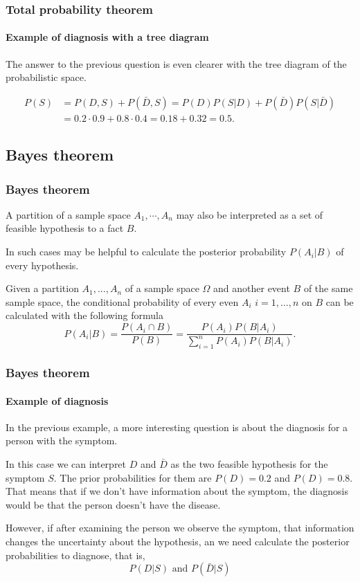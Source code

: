 \begin{frame}
\frametitle{Total probability theorem}
\framesubtitle{Example of diagnosis with a tree diagram}
The answer to the previous question is even clearer with the tree diagram of the probabilistic space.

\begin{center}
\end{center}

\begin{align*}
P(S) &= P(D,S) + P(\bar D,S) = P(D)P(S|D)+P(\bar D)P(S|\bar D)\\
& = 0.2\cdot 0.9+ 0.8\cdot 0.4 = 0.18 + 0.32 = 0.5.
\end{align*}
\end{frame}


\subsection{Bayes theorem}

\begin{frame}
\frametitle{Bayes theorem}
A partition of a sample space $A_1,\cdots,A_n$ may also be interpreted as a set of feasible hypothesis to a fact
$B$.

In such cases may be helpful to calculate the posterior probability $P(A_i|B)$ of every hypothesis.

\begin{theorem}[Bayes]
Given a partition $A_1,\ldots,A_n$ of a sample space $\Omega$ and another event $B$ of the same sample space, the
conditional probability of every even $A_i$ $i=1,\ldots,n$ on $B$ can be calculated with the following formula
\[
P(A_i|B) = \frac{P(A_i\cap B)}{P(B)} = \frac{P(A_i)P(B|A_i)}{\sum_{i=1}^n P(A_i)P(B|A_i)}.
\]
\end{theorem}
\end{frame}


\begin{frame}
\frametitle{Bayes theorem}
\framesubtitle{Example of diagnosis}
In the previous example, a more interesting question is about the diagnosis for a person with the symptom.  

In this case we can interpret $D$ and $\bar D$ as the two feasible hypothesis for the symptom $S$.
The prior probabilities for them are $P(D)=0.2$ and $P(D)=0.8$.
That means that if we don't have information about the symptom, the diagnosis would be that the person doesn't have the
disease.

However, if after examining the person we observe the symptom, that information changes the uncertainty about the
hypothesis, an we need calculate the posterior probabilities to diagnose, that is,
\[
P(D|S) \mbox{ and } P(\bar D|S)
\]
\end{frame}


